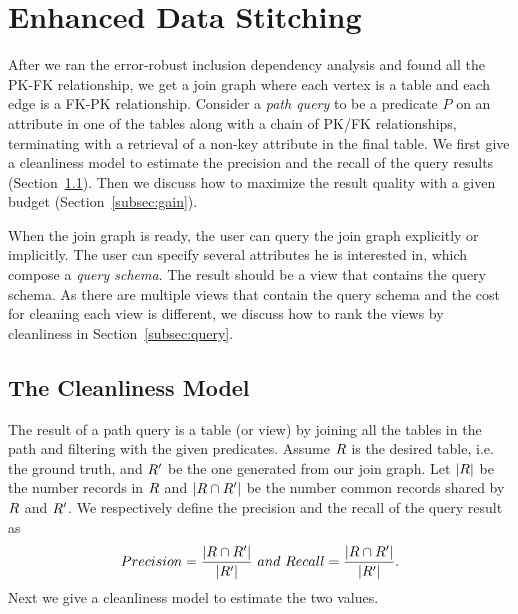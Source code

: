 

\section{Enhanced Data Stitching}\label{sec:enhancedstitching}


After we ran the error-robust inclusion dependency analysis and found all the PK-FK relationship, we get a join graph where each vertex is a table and each edge is a FK-PK relationship. Consider a \emph{path query} to be a predicate $P$ on an attribute in one of the tables along with a chain of PK/FK relationships, terminating with a retrieval of a non-key attribute in the final table. We first give a cleanliness model to estimate the precision and the recall of the query results (Section~\ref{subsec:model:recall}). Then we discuss how to maximize the result quality with a given budget (Section~\ref{subsec:gain}).


When the join graph is ready, the user can query the join graph explicitly or implicitly. The user can specify several attributes he is interested in, which compose a \emph{query schema}. The result should be a view that contains the query schema. As there are multiple views that contain the query schema and the cost for cleaning each view is different, we discuss how to rank the views by cleanliness in Section~\ref{subsec:query}.



\subsection{The Cleanliness Model}\label{subsec:model:recall}

The result of a path query is a table (or view) by joining all the tables in the path and filtering with the given predicates. Assume $R$ is the desired table, i.e. the ground truth, and $R'$ be the one generated from our join graph. Let  $|R|$ be the number records in $R$ and $|R\cap R'|$ be the number common records shared by $R$ and $R'$. We respectively define the precision and the recall of the query result as
$$Precision=\frac{|R\cap R'|}{|R'|}~and~Recall=\frac{|R\cap R'|}{|R'|}.$$
Next we give a cleanliness model to estimate the two values.

